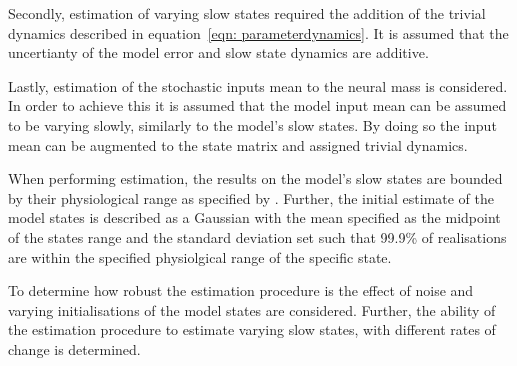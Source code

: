 Secondly, estimation of varying slow states required the addition of the trivial dynamics described in equation~\ref{eqn: parameterdynamics}. It is assumed that the uncertianty of the model error and slow state dynamics are additive.

Lastly, estimation of the stochastic inputs mean to the neural mass is considered. In order to achieve this it is assumed that the model input mean can be assumed to be varying slowly, similarly to the model's slow states. By doing so the input mean can be augmented to the state matrix and assigned trivial dynamics. 

When performing estimation, the results on the model's slow states are bounded by their physiological range as specified by \cite{wendling2002epileptic}. Further, the initial estimate of the model states is described as a Gaussian with the mean specified as the midpoint of the states range and the standard deviation set such that 99.9\% of realisations are within the specified physiolgical range of the specific state. 

To determine how robust the estimation procedure is the effect of noise and varying initialisations of the model states are considered. Further, the ability of the estimation procedure to estimate varying slow states, with different rates of change is determined. 






